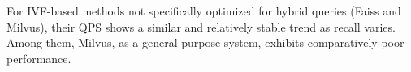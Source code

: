 \documentclass[sigconf, nonacm]{acmart}
\begin{document}
	For IVF-based methods not specifically optimized for hybrid queries (Faiss and Milvus), their QPS shows a similar and relatively stable trend as recall varies. Among them, Milvus, as a general-purpose system, exhibits comparatively poor performance.
	
%	
%	
%
%	
	
\end{document}
